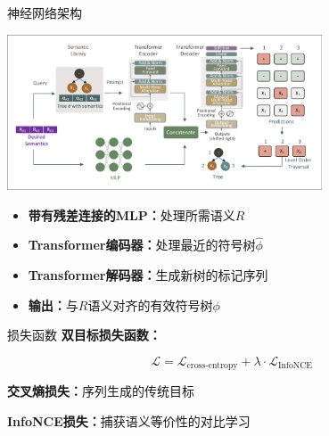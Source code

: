 \documentclass[aspectratio=1610]{beamer}
\begin{document}
    \begin{frame}{神经网络架构}
        \begin{center}
            \includegraphics[width=0.7\textwidth]{figs/NN.pdf}
        \end{center}

        \begin{itemize}
            \item \textbf{带有残差连接的MLP：}处理所需语义$R$
            \item \textbf{Transformer编码器：}处理最近的符号树$\hat{\phi}$
            \item \textbf{Transformer解码器：}生成新树的标记序列
            \item \textbf{输出：}与$R$语义对齐的有效符号树$\phi$
        \end{itemize}
    \end{frame}



    \begin{frame}{损失函数}
        \textbf{双目标损失函数：}

        \begin{equation}
            \mathcal{L} = \mathcal{L}_{\text{cross-entropy}} + \lambda \cdot \mathcal{L}_{\text{InfoNCE}}
        \end{equation}

        \textbf{交叉熵损失：}序列生成的传统目标

        \textbf{InfoNCE损失：}捕获语义等价性的对比学习
    \end{frame}
\end{document}
